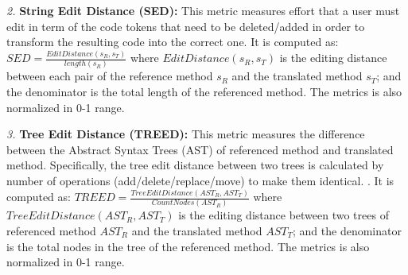 \emph{2.} \textbf{String Edit Distance (SED):} This metric measures
effort that a user must edit in term of the code tokens
that need to be deleted/added in order to transform the
resulting code into the correct one. It is computed as:  $SED = \frac{EditDistance\left(s_R, s_T\right)}{length\left(s_R\right)}$ where $EditDistance\left(s_R, s_T\right)$ is the editing distance between each pair of the reference method $s_R$ and the translated method $s_T$; and the denominator is the total length of the referenced method. The metrics is also normalized in 0-1 range.

\emph{3.} \textbf{Tree Edit Distance (TREED):} This metric measures the difference between the Abstract Syntax Trees (AST) of referenced method and translated method. Specifically, the tree edit distance between two trees is calculated by number of operations (add/delete/replace/move) to make them identical. \cite{algorithm}. 
It is computed as:  $TREED = \frac{TreeEditDistance\left(AST_R, AST_T\right)}{CountNodes \left(AST_R\right)}$ where $TreeEditDistance\left(AST_R, AST_T\right)$ is the editing distance between two trees of referenced method $AST_R$ and the translated method $AST_T$; and the denominator is the total nodes in the tree of the referenced method.  The metrics is also normalized in 0-1 range.


